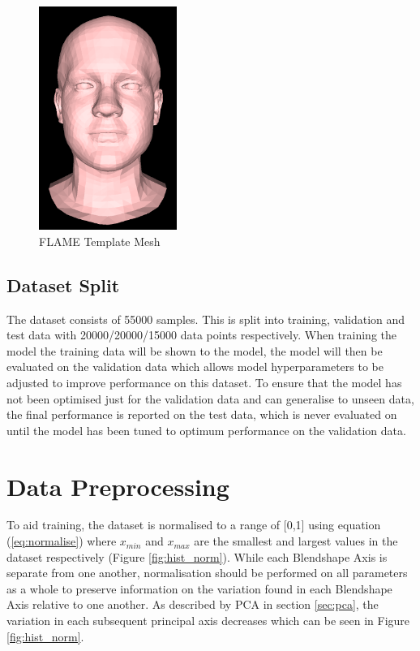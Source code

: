 \begin{figure}[h!]
    \centering
        \includegraphics[width=0.4\textwidth]{figures/dataset/flame_template.png}
    \caption{FLAME Template Mesh \cite{Li2017}}\label{fig:FLAME_template}
\end{figure}

\subsection{Dataset Split}
The dataset consists of 55000 samples.
This is split into training, validation and test data with 20000/20000/15000 data points respectively.
When training the model the training data will be shown to the model, the model will then be evaluated on the validation data which allows model hyperparameters to be adjusted to improve performance on this dataset.
To ensure that the model has not been optimised just for the validation data and can generalise to unseen data, the final performance is reported on the test data, which is never evaluated on until the model has been tuned to optimum performance on the validation data.

\section{Data Preprocessing}
To aid training, the dataset is normalised to a range of [0,1] using equation (\ref{eq:normalise}) where $x_{min}$ and $x_{max}$ are the smallest and largest values in the dataset respectively (Figure \ref{fig:hist_norm}).
While each Blendshape Axis is separate from one another, normalisation should be performed on all parameters as a whole to preserve information on the variation found in each Blendshape Axis relative to one another.
As described by PCA in section \ref{sec:pca}, the variation in each subsequent principal axis decreases which can be seen in Figure \ref{fig:hist_norm}.

